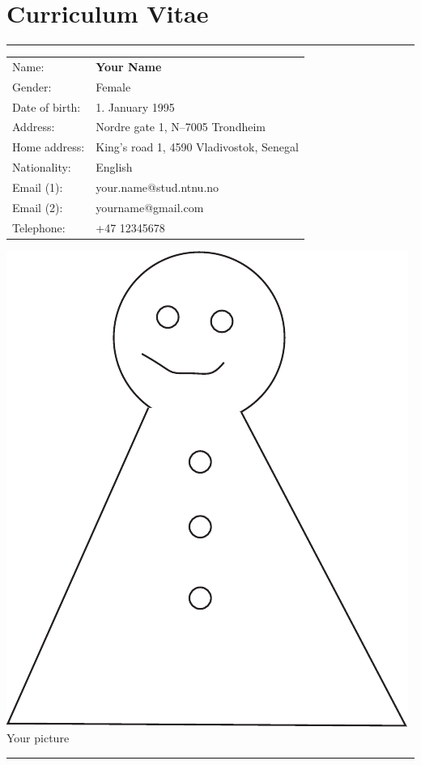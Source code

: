 
\chapter*{Curriculum Vitae}
\hrule
\begin{minipage}[t]{0.65\linewidth}
\begin{tabular}{ll}
Name: & \textbf{Your Name}\\
Gender: & Female\\
Date of birth: & 1. January 1995\\
Address: & Nordre gate 1, N--7005 Trondheim \\
Home address: & King's road 1, 4590 Vladivostok, Senegal\\
Nationality:    & English \\
Email (1): & your.name@stud.ntnu.no\\
Email (2): & yourname@gmail.com\\
Telephone: & +47 12345678\\
\end{tabular} 
\end{minipage}\hfill
\begin{minipage}[t]{0.25\linewidth}
\includegraphics[scale=0.3]{fig/me}\\[1pc] Your picture
\end{minipage}
\hrule

